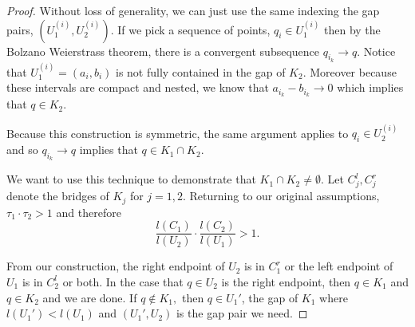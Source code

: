 \begin{proof}
    Without loss of generality, we can just use the same indexing the gap pairs, $(U_1^{(i)}, U_2^{(i)})$.  If we pick a sequence of points, $q_{i} \in U_1^{(i)}$ then by the Bolzano Weierstrass theorem, there is a convergent subsequence $q_{i_k} \to q$.  Notice that $U_1^{(i)} = (a_i, b_i)$ is not fully contained in the gap of $K_2$.  Moreover because these intervals are compact and nested, we know that $a_{i_k} - b_{i_k} \to 0$ which implies that $q \in K_2$.  

    Because this construction is symmetric, the same argument applies to $q_{i} \in U_2^{(i)}$ and so $q_{i_k} \to q$ implies that $q \in K_1 \cap K_2$.  

    We want to use this technique to demonstrate that $K_1 \cap K_2 \neq \emptyset.$ Let $C_j^l, C_j^r$ denote the bridges of $K_j$ for $j = 1,2$.  Returning to our original assumptions, $\tau_1 \cdot \tau_2 > 1$ and therefore $$\frac{l(C_1)}{l(U_2)} \cdot \frac{l(C_2)}{l(U_1)} > 1.$$  
    
    From our construction, the right endpoint of $U_2$ is in $C_1^r$ or the left endpoint of $U_1$ is in $C_2^l$ or both.  
    In the case that $q \in U_2$ is the right endpoint, then $q \in K_1$ and $q \in K_2$ and we are done.  
    If $q \not\in K_1,$ then $q \in U_1'$, the gap of $K_1$ where $l(U_1') < l(U_1)$ and $(U_1', U_2)$ is the gap pair we need.  

\end{proof}